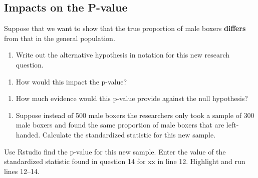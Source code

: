 \documentclass[
]{report}
\providecommand{\tightlist}{%
  \setlength{\itemsep}{0pt}\setlength{\parskip}{0pt}}
\begin{document}
\hypertarget{impacts-on-the-p-value}{%
\subsection*{Impacts on the P-value}\label{impacts-on-the-p-value}}

Suppose that we want to show that the true proportion of male boxers \textbf{differs} from that in the general population.

\begin{enumerate}
\def\labelenumi{\arabic{enumi}.}
\setcounter{enumi}{12}
\tightlist
\item
  Write out the alternative hypothesis in notation for this new research question.
\end{enumerate}

\vspace{0.5in}

\begin{enumerate}
\def\labelenumi{\arabic{enumi}.}
\setcounter{enumi}{13}
\tightlist
\item
  How would this impact the p-value?
\end{enumerate}

\vspace{0.2in}

\begin{enumerate}
\def\labelenumi{\arabic{enumi}.}
\setcounter{enumi}{14}
\tightlist
\item
  How much evidence would this p-value provide against the null hypothesis?
\end{enumerate}

\vspace{0.3in}

\begin{enumerate}
\def\labelenumi{\arabic{enumi}.}
\setcounter{enumi}{15}
\tightlist
\item
  Suppose instead of 500 male boxers the researchers only took a sample of 300 male boxers and found the same proportion of male boxers that are left-handed. Calculate the standardized statistic for this new sample.
\end{enumerate}

\vspace{1in}

Use Rstudio find the p-value for this new sample. Enter the value of the standardized statistic found in question 14 for xx in line 12. Highlight and run lines 12--14.
\end{document}
